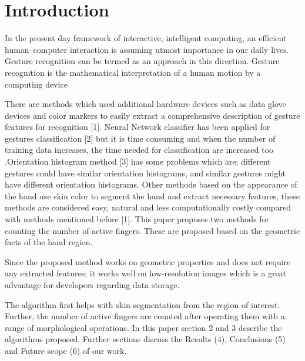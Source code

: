 \documentclass[conference]{IEEEtran}
\begin{document}




%
\IEEEpeerreviewmaketitle



\section{Introduction}
In the present day framework of interactive, intelligent computing, an efficient human–computer interaction is assuming utmost importance in our daily lives. Gesture recognition can be termed as an approach in this direction.
Gesture recognition is the mathematical interpretation of a human motion by a computing device

 There are methods which used additional hardware devices such as data glove devices and color markers to easily extract a comprehensive description of gesture features for recognition [1]. Neural Network classifier has been applied for gestures classification [2] but it is time consuming and when the number of training data increases, the time needed for classification are increased too .Orientation histogram method [3] has some problems which are; different gestures could have similar orientation histograms, and similar gestures might have different orientation histograms. Other methods based on the appearance of the hand use skin color to segment the hand and extract necessary features, these methods are considered easy, natural and less computationally costly compared with methods mentioned before [1].
This paper proposes two methods for counting the number of active fingers. These are proposed based on the geometric facts of the hand region. 

Since the proposed method works on geometric properties and does not require any extracted features; it works well on low-resolution images which is a great advantage for developers regarding data storage.

The algorithm first helps with skin segmentation from the region of interest. Further, the number of active fingers are counted after operating them with a range of morphological operations.
In this paper section 2 and 3 describe the algorithms proposed. Further sections discuss the Results (4), Conclusions (5) and Future scope (6) of our work. 
\end{document}
